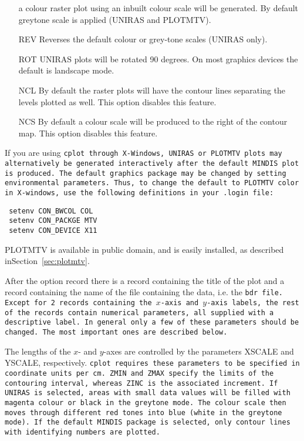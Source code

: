 \begin{itemize}
	a colour raster plot using an inbuilt colour scale will be generated. 
	By default greytone scale is applied (UNIRAS and PLOTMTV).
\item[REV] Reverses the default colour or grey-tone scales (UNIRAS only).
\item[ROT] UNIRAS plots will be rotated 90 degrees. On most
graphics devices the default is landscape mode. 
\item[NCL] By default the raster plots will have the contour lines
separating the levels plotted as well. This option disables this feature.
\item[NCS] By default a colour scale will be produced to the right of
the contour map. This option disables this feature.
\end{itemize}

If you are using \tt cplot \rm through X-Windows, UNIRAS or PLOTMTV plots may
alternatively be 
generated interactively after the
default MINDIS plot is produced. 
The default graphics package may be changed by setting environmental 
parameters. Thus, to change the default to PLOTMTV color in X-windows, use the following definitions in your \tt .login \rm file:

\begin{verbatim}
 setenv CON_BWCOL COL
 setenv CON_PACKGE MTV
 setenv CON_DEVICE X11
\end{verbatim}

PLOTMTV is available in public domain, and is easily installed, as described
inSection~\ref{sec:plotmtv}.  
 
After the option record there is a record containing the title of the plot and
a record containing the name of the file containing the data, i.e. the
\tt bdr \rm
file. Except for 2 records containing the $x$-axis and $y$-axis
labels,  the rest 
of the records contain numerical parameters, all supplied with a descriptive
label. In general only a few of these parameters should be changed. 
The most important ones are described below.

The lengths of the $x$- and $y$-axes are controlled by the parameters
XSCALE  and 
YSCALE, respectively. \tt cplot \rm requires these parameters to be
specified  in
coordinate units per cm. ZMIN and ZMAX specify the limits of the contouring
interval, whereas ZINC is the associated increment. If UNIRAS is selected, 
areas with small data values will be filled with magenta colour or black 
in the greytone mode. The colour scale then moves through different red tones
into blue (white in the greytone mode). If the default MINDIS package is
selected, only contour lines with identifying numbers are plotted. 



